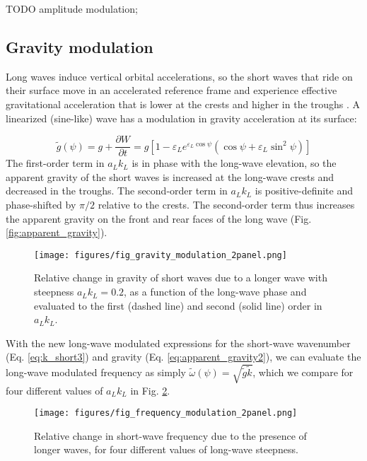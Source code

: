 \documentclass[draft]{agujournal2019}
\begin{document}
TODO amplitude modulation;

\subsection{Gravity modulation}
\label{subsection:gravity_modulation}

Long waves induce vertical orbital accelerations, so the short
waves that ride on their surface move in an accelerated reference frame and
experience effective gravitational acceleration that is lower at the crests and
higher in the troughs \cite{longuet1986eulerian,longuet1987propagation}.
A linearized (sine-like) wave has a modulation in gravity acceleration at its
surface:

\begin{equation}
\label{eq:effective_gravity}
\widetilde{g}(\psi) = g + \dfrac{\partial W}{\partial t} = g \left[
  1 - \varepsilon_L e^{\varepsilon_L \cos{\psi}} \left(
    \cos{\psi} + \varepsilon_L \sin^2{\psi}
  \right)
\right]
\end{equation}
The first-order term in $a_L k_L$ is in phase with the long-wave elevation,
so the apparent gravity of the short waves is increased at the long-wave crests
and decreased in the troughs.
The second-order term in $a_L k_L$ is positive-definite and phase-shifted by
$\pi/2$ relative to the crests.
The second-order term thus increases the apparent gravity on the front and rear
faces of the long wave (Fig. \ref{fig:apparent_gravity}).

\begin{figure}[h]
\label{fig:gravity_modulation}
\centering
\texttt{[image: figures/fig\_gravity\_modulation\_2panel.png]}
\caption{
  Relative change in gravity of short waves due to a longer wave with steepness $a_L k_L = 0.2$,
  as a function of the long-wave phase and evaluated to the first (dashed line) and second (solid line) order in $a_L k_L$.
}
\end{figure}

With the new long-wave modulated expressions for the short-wave wavenumber
(Eq. \ref{eq:k_short3}) and gravity (Eq. \ref{eq:apparent_gravity2}), we can
evaluate the long-wave modulated frequency as simply
$\widetilde{\omega}(\psi) = \sqrt{\widetilde{g} \widetilde{k}}$, which we compare
for four different values of $a_L k_L$ in Fig. \ref{fig:frequency_modulation}.

\begin{figure}[h]
\label{fig:frequency_modulation}
\centering
\texttt{[image: figures/fig\_frequency\_modulation\_2panel.png]}
\caption{
  Relative change in short-wave frequency due to the presence of longer
  waves, for four different values of long-wave steepness.
}
\end{figure}
\end{document}
